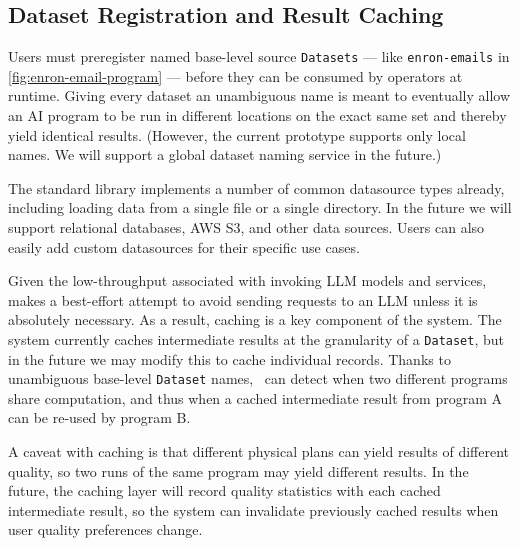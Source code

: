 





\subsection{Dataset Registration and Result Caching}
\label{sec:registration}
Users must preregister named base-level source \texttt{Datasets} --- like {\tt enron-emails} in \autoref{fig:enron-email-program} --- before they can be consumed by \system{} operators at runtime. Giving every dataset an unambiguous name is meant to eventually allow an AI program to be run in different locations on the exact same set and thereby yield identical results. (However, 
the current prototype supports only local names. We will support a global dataset naming service in the future.)

The \system{} standard library implements a number of common datasource types already, including loading data from a single file or a single directory. In the future we will support relational databases, AWS S3, and other data sources. Users can also easily add custom datasources for their specific use cases. 

Given the low-throughput associated with invoking LLM models and services, \system{} makes a best-effort attempt to avoid sending requests to an LLM unless it is absolutely necessary. As a result, caching is a key component of the \system{} system.  The system currently  caches intermediate results at the granularity of a \texttt{Dataset}, but in the future we may modify this to cache individual records.  Thanks to unambiguous base-level \texttt{Dataset} names, \system\ can detect when two different programs share computation, and thus when a cached intermediate result from program A can be re-used by program B.

A caveat with caching is that different physical plans can yield results of different quality, so two runs of the same program may yield different results. In the future, the caching layer will record quality statistics with each cached intermediate result, so the system can invalidate previously cached results when user quality preferences change.








